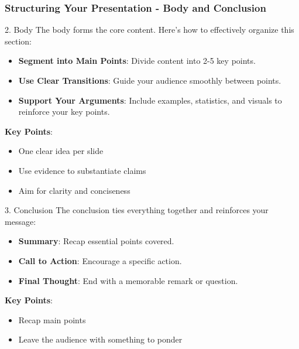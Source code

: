 \documentclass[aspectratio=169]{beamer}
\begin{document}
\begin{frame}[fragile]
    \frametitle{Structuring Your Presentation - Body and Conclusion}
    \begin{block}{2. Body}
        The body forms the core content. Here’s how to effectively organize this section:
        \begin{itemize}
            \item \textbf{Segment into Main Points}: Divide content into 2-5 key points.
            \item \textbf{Use Clear Transitions}: Guide your audience smoothly between points.
            \item \textbf{Support Your Arguments}: Include examples, statistics, and visuals to reinforce your key points.
        \end{itemize}
        \textbf{Key Points}:
        \begin{itemize}
            \item One clear idea per slide
            \item Use evidence to substantiate claims
            \item Aim for clarity and conciseness
        \end{itemize}
    \end{block}

    \begin{block}{3. Conclusion}
        The conclusion ties everything together and reinforces your message:
        \begin{itemize}
            \item \textbf{Summary}: Recap essential points covered.
            \item \textbf{Call to Action}: Encourage a specific action.
            \item \textbf{Final Thought}: End with a memorable remark or question.
        \end{itemize}
        \textbf{Key Points}:
        \begin{itemize}
            \item Recap main points
            \item Leave the audience with something to ponder
        \end{itemize}
    \end{block}
\end{frame}
\end{document}
